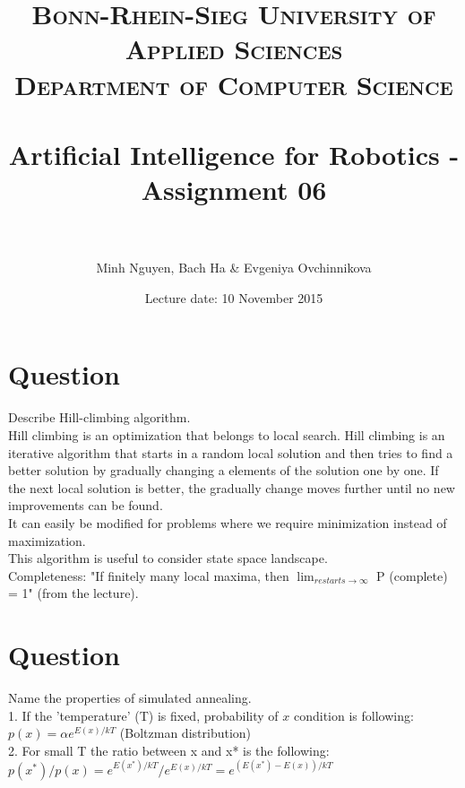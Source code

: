 \documentclass[paper=a4, fontsize=11pt]{scrartcl} %
\title{	
\normalfont \normalsize 
\textsc{Bonn-Rhein-Sieg University of Applied Sciences \\Department of Computer Science} \\ [10pt] %
\horrule{0.5pt} \\[0.4cm] %
\LARGE Artificial Intelligence for Robotics - Assignment 06 \\ %
\horrule{2pt} \\[0.5cm] %
}
\date{}
\author{Minh Nguyen, Bach Ha \& Evgeniya Ovchinnikova} %
\date{Lecture date: 10 November 2015}
\begin{document}
\maketitle %


\section{Question}

Describe Hill-climbing algorithm.\\

Hill climbing is an optimization that belongs to local search. Hill climbing is an iterative algorithm that starts in a random local solution and then tries to find a better solution by gradually changing a elements of the solution one by one. If the next local solution is better, the gradually change moves further until no new improvements can be found.\\

It can easily be modified for problems where we require minimization instead of maximization.\\

This algorithm is useful to consider state space landscape.\\

Completeness: "If finitely many local maxima, then $\lim_{restarts \to \infty}$ P (complete) = 1" (from the lecture).

\section{Question}

Name the properties of simulated annealing.\\


1. If the 'temperature' (T) is fixed, probability of $x$ condition is following:\\


$p(x) = \alpha e^{E(x)/kT}$ (Boltzman distribution)\\

2. For small T the ratio between x and x* is the following:\\


$p(x^*)/p(x) = e^{E(x^*)/kT}/e^{E(x)/kT} = e^{(E(x^*)-E(x))/kT}$\\
\end{document}
